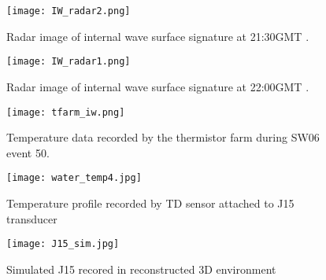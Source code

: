 




\begin{figure}[h]
\centering
  \texttt{[image: IW\_radar2.png]}\\
  \caption{Radar image of internal wave surface signature at 21:30GMT . }
  \label{fig:IW_radar2}
\end{figure}

\begin{figure}[h]
\centering
  \texttt{[image: IW\_radar1.png]}\\
  \caption{Radar image of internal wave surface signature at 22:00GMT . }
  \label{fig:IW_radar1}
\end{figure}


 \begin{figure}[h]
\centering
  \texttt{[image: tfarm\_iw.png]}\\
  \caption{Temperature data recorded by the thermistor farm during SW06 event 50. }
  \label{fig:tfarm_dir}
\end{figure}

\begin{figure}[h]
\centering
  \texttt{[image: water\_temp4.jpg]}\\
  \caption{Temperature profile recorded by TD sensor attached to J15 transducer}
  \label{fig:water_temp4}
\end{figure}


\begin{figure}[h]
\centering
  \texttt{[image: J15\_sim.jpg]}\\
  \caption{Simulated J15 recored in reconstructed 3D environment}
  \label{fig:water_temp4}
\end{figure}

